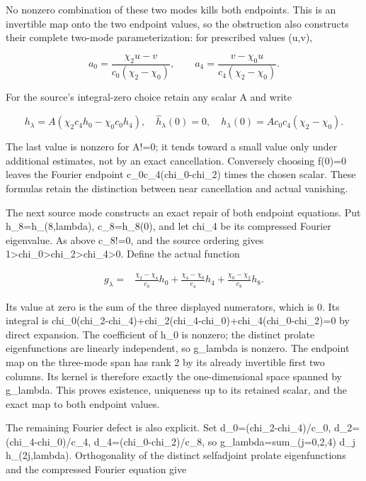 \documentclass[
]{article}
\begin{document}
No nonzero combination of these two modes kills both endpoints. This is
an invertible map onto the two endpoint values, so the obstruction also
constructs their complete two-mode parameterization: for prescribed
values (u,v),

\[
a_0=\frac{\chi_2u-v}{c_0(\chi_2-\chi_0)},\qquad
a_4=\frac{v-\chi_0u}{c_4(\chi_2-\chi_0)}.
\tag{C9.2}
\]

For the source's integral-zero choice retain any scalar A and write

\[
h_\lambda=A(\chi_2 c_4h_0-\chi_0 c_0h_4),\quad
\widehat h_\lambda(0)=0,\quad
h_\lambda(0)=A c_0c_4(\chi_2-\chi_0).
\tag{C9.3}
\]

The last value is nonzero for A!=0; it tends toward a small value only
under additional estimates, not by an exact cancellation. Conversely
choosing f(0)=0 leaves the Fourier endpoint c\_0c\_4(chi\_0-chi\_2)
times the chosen scalar. These formulas retain the distinction between
near cancellation and actual vanishing.

The next source mode constructs an exact repair of both endpoint
equations. Put h\_8=h\_(8,lambda), c\_8=h\_8(0), and let chi\_4 be its
compressed Fourier eigenvalue. As above c\_8!=0, and the source ordering
gives
1\textgreater chi\_0\textgreater chi\_2\textgreater chi\_4\textgreater0.
Define the actual function

\[
\begin{aligned}
g_\lambda={}&\frac{\chi_2-\chi_4}{c_0}h_0
+\frac{\chi_4-\chi_0}{c_4}h_4
+\frac{\chi_0-\chi_2}{c_8}h_8.\end{aligned}
\tag{C9.4}
\]

Its value at zero is the sum of the three displayed numerators, which is
0. Its integral is
chi\_0(chi\_2-chi\_4)+chi\_2(chi\_4-chi\_0)+chi\_4(chi\_0-chi\_2)=0 by
direct expansion. The coefficient of h\_0 is nonzero; the distinct
prolate eigenfunctions are linearly independent, so g\_lambda is
nonzero. The endpoint map on the three-mode span has rank 2 by its
already invertible first two columns. Its kernel is therefore exactly
the one-dimensional space spanned by g\_lambda. This proves existence,
uniqueness up to its retained scalar, and the exact map to both endpoint
values.

The remaining Fourier defect is also explicit. Set
d\_0=(chi\_2-chi\_4)/c\_0, d\_2=(chi\_4-chi\_0)/c\_4,
d\_4=(chi\_0-chi\_2)/c\_8, so g\_lambda=sum\_(j=0,2,4) d\_j
h\_(2j,lambda). Orthogonality of the distinct selfadjoint prolate
eigenfunctions and the compressed Fourier equation give
\end{document}
